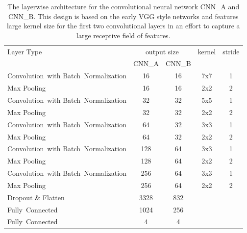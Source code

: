  \begin{table}[]
  \centering
  \begin{tabularx}{\textwidth}{Xcccc}
  \toprule
Layer Type                    & \multicolumn{2}{c}{output size} & kernel & stride  \\ 
                                                    & CNN\_A & CNN\_B &      &     \\\midrule

\mbox{Convolution with} \mbox{Batch Normalization}  & 16     & 16   & 7x7    & 1   \\ 
Max Pooling                                         & 16     & 16   & 2x2    & 2   \\ 
\mbox{Convolution with} \mbox{Batch Normalization}  & 32     & 32   & 5x5    & 1   \\ 
Max Pooling                                         & 32     & 32   & 2x2    & 2   \\ 
\mbox{Convolution with} \mbox{Batch Normalization}  & 64     & 32   & 3x3    & 1   \\ 
Max Pooling                                         & 64     & 32   & 2x2    & 2   \\ 
\mbox{Convolution with} \mbox{Batch Normalization}  & 128    & 64   & 3x3    & 1   \\ 
Max Pooling                                         & 128    & 64   & 2x2    & 2   \\ 
\mbox{Convolution with} \mbox{Batch Normalization}  & 256    & 64   & 3x3    & 1   \\ 
Max Pooling                                         & 256    & 64   & 2x2    & 2   \\ 
Dropout \& Flatten                                  & 3328   & 832  &        &     \\ 
\mbox{Fully Connected}                              & 1024   & 256  &        &     \\ 
\mbox{Fully Connected}                              & 4      & 4    &        &     \\ 
  \bottomrule
  \end{tabularx}
  \caption{The layerwise architecture for the convolutional neural network CNN\_A and CNN\_B. This design is based on the early VGG style networks and features large kernel size for the first two convolutional layers in an effort to capture a large receptive field of features.}
  \label{tab:layers_CNN_A}
  \end{table}


